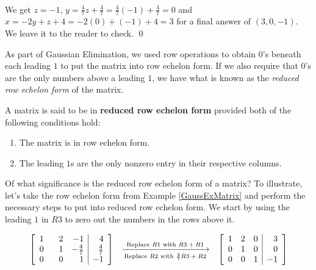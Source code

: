 \documentclass{ximera}
\begin{document}
\begin{ex}
\[\begin{array}{ccc}
\end{array}\]

We get $z=-1$,  $y = \frac{4}{7} z + \frac{4}{7} = \frac{4}{7}(-1)+\frac{4}{7} = 0$ and $x = -2y+z+4 = -2(0)+(-1)+4 = 3$ for a final answer of $(3,0,-1)$.  We leave it to the reader to check. \qed

\end{ex}

As part of Gaussian Elimination, we used row operations to obtain $0$'s beneath each leading $1$ to put the matrix into row echelon form.  If we also require that $0$'s are the only numbers above a leading $1$, we have what is known as  the   \textit{reduced row echelon form} of the matrix.

\smallskip

\colorbox{ResultColor}{\bbm  

\begin{defn} \label{reducedrowechelonform} A matrix is said to be in \textbf{reduced row echelon form} provided both of the following conditions hold:

\begin{enumerate}

\item  The matrix is in row echelon form.

\item The leading $1$s are the only nonzero entry in their respective columns.

\end{enumerate}

\end{defn}

\ebm}

\smallskip

Of what significance is the reduced row echelon form of a matrix?  To illustrate, let's take the row echelon form from Example \ref{GaussExMatrix} and perform the necessary steps to put into reduced row echelon form.  We start by using the leading $1$ in $R3$ to zero out the numbers in the rows above it.

\[ \begin{array}{ccc}

\left[ \begin{array}{rrr|r} 
1 & \hphantom{-}2 & -1 & 4 \\ 
0 & 1 & -\frac{4}{7} & \frac{4}{7} \\ 
0 & 0 &1 & -1 \\ 
\end{array} \right]  
& 
\xrightarrow[\text{Replace $R2$ with $\frac{4}{7} R3 + R2$}]{\text{Replace $R1$ with $R3+R1$}} 
& 
\left[ \begin{array}{rrr|r} 
1 & 2 & 0 & 3 \\ 
0 & 1 & 0 & 0 \\ 
0 & 0 &1 & -1 \\ 
\end{array} \right]  

\end{array}\]
\end{document}
